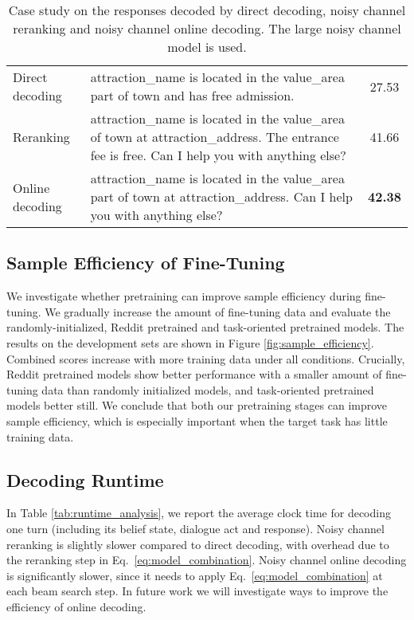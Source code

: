 \documentclass[11pt,a4paper]{article}
\begin{document}
\begin{table*}[t]
{\begin{tabular}{l@{\hskip 0.08in}l@{\hskip 0.08in}c}
     Direct decoding & attraction\_name is located in the value\_area part of town and has free admission. & 27.53 \\
    
    \multirow{2}{*}{Reranking} & \multirow{2}{*}{\parbox{15cm}{attraction\_name is located in the value\_area of town at attraction\_address. The entrance fee is free. Can I help you with anything else?}}  & \multirow{2}{*}{41.66} \\ \\
    
    Online decoding & attraction\_name is located in the value\_area part of town at attraction\_address. Can I help you with anything else? & \textbf{42.38} \\
    \bottomrule
    \end{tabular}
    }
    \caption{Case study on the responses decoded by direct decoding, noisy channel reranking and noisy channel online decoding. The large noisy channel model is used. \label{tab:case_study}}
\end{table*}


\subsection{Sample Efficiency of Fine-Tuning \label{sec:sample_efficiency}}

We investigate whether pretraining can improve sample efficiency during fine-tuning. We gradually increase the amount of fine-tuning data and evaluate the randomly-initialized, Reddit pretrained and task-oriented pretrained models.
The results on the development sets are shown in Figure \ref{fig:sample_efficiency}. Combined scores increase with more training data under all conditions. Crucially, Reddit pretrained models show better performance with a smaller amount of fine-tuning data than randomly initialized models, and task-oriented pretrained models better still. We conclude that both our pretraining stages can improve sample efficiency, which is especially important when the target task has little training data.




\subsection{Decoding Runtime \label{sec:runtime_analysis}}

In Table \ref{tab:runtime_analysis}, we report the average clock time for decoding one turn (including its belief state, dialogue act and response). Noisy channel reranking is slightly slower compared to direct decoding, with overhead due to the reranking step in Eq.\ \ref{eq:model_combination}. Noisy channel online decoding is significantly slower, since it needs to apply Eq.\ \ref{eq:model_combination} at each beam search step. In future work we will investigate ways to improve the efficiency of online decoding.
\end{document}
